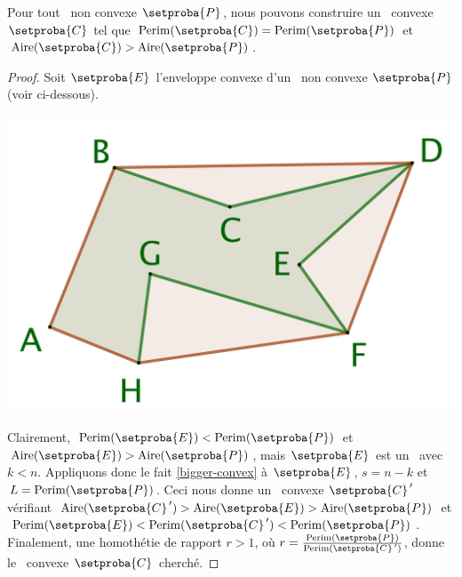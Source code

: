 

\begin{fact} \label{must-be-conv}
    Pour tout \ngone\ non convexe $\setproba{P}$,
	nous pouvons construire un \ngone\ convexe $\setproba{C}$ tel que
	$\perim{\setproba{C}} = \perim{\setproba{P}}$
	et
	$\area{\setproba{C}} > \area{\setproba{P}}$.
\end{fact}


\begin{proof}
	Soit $\setproba{E}$ l'enveloppe convexe d'un \ngone\ non convexe $\setproba{P}$ (voir ci-dessous).
	
	\begin{center}
		\centering
		\small\itshape
		\includegraphics[scale=.2]{content/polygon/sol-must-be/convex-hull.png}
	\end{center}
	
	Clairement,
	$\perim{\setproba{E}} < \perim{\setproba{P}}$
	et
	$\area{\setproba{E}} > \area{\setproba{P}}$,
	mais
	$\setproba{E}$ est un \kgone\ avec $k < n$. 
	Appliquons donc le fait \ref{bigger-convex} à $\setproba{E}$, $s = n - k$ et $L = \perim{\setproba{P}}$.
	Ceci nous donne un \ngone\ convexe $\primeit{\setproba{C}}$ vérifiant
	$ \area{\primeit{\setproba{C}}} > \area{\setproba{E}} > \area{\setproba{P}}$
	et
	$\perim{\setproba{E}} < \perim{\primeit{\setproba{C}}} < \perim{\setproba{P}}$.
	Finalement, une homothétie de rapport $r > 1$, où $r = \frac{ \perim{\setproba{P}} }{ \perim{\primeit{\setproba{C}}} }$, donne le \ngone\ convexe $\setproba{C}$ cherché.
	
	\null\vspace{-5ex}
\end{proof}


